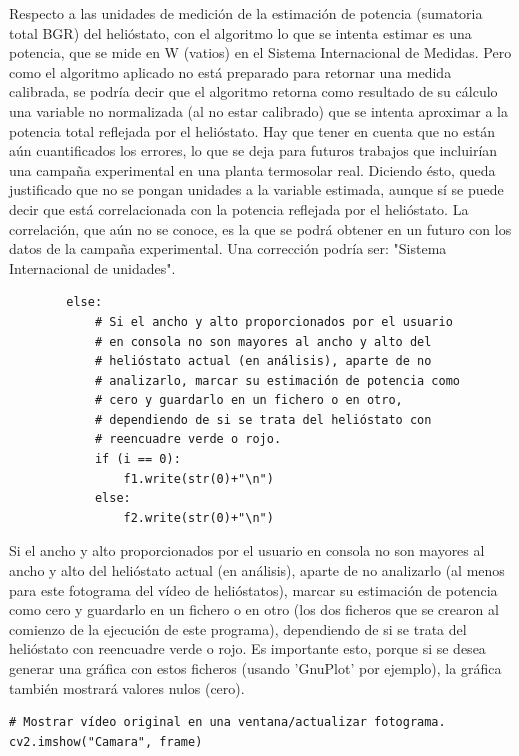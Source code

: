 Respecto a las unidades de medición de la estimación de potencia (sumatoria total BGR) del helióstato, con el algoritmo lo que se intenta estimar es una potencia, que se mide en W (vatios) en el Sistema Internacional de Medidas. Pero como el algoritmo aplicado no está preparado para retornar una medida calibrada, se podría decir que el algoritmo retorna como resultado de su cálculo una variable no normalizada (al no estar calibrado) que se intenta aproximar a la potencia total reflejada por el helióstato. Hay que tener en cuenta que no están aún cuantificados los errores, lo que se deja para futuros trabajos que incluirían una campaña experimental en una planta termosolar real. Diciendo ésto, queda justificado que no se pongan unidades a la variable estimada, aunque sí se puede decir que está correlacionada con la potencia reflejada por el helióstato. La correlación, que aún no se conoce, es la que se podrá obtener en un futuro con los datos de la campaña experimental. Una corrección podría ser: "Sistema Internacional de unidades".

\begin{lstlisting}
		else:
            # Si el ancho y alto proporcionados por el usuario
            # en consola no son mayores al ancho y alto del
            # helióstato actual (en análisis), aparte de no
            # analizarlo, marcar su estimación de potencia como
            # cero y guardarlo en un fichero o en otro,
            # dependiendo de si se trata del helióstato con
            # reencuadre verde o rojo.
            if (i == 0):
                f1.write(str(0)+"\n")
            else:
                f2.write(str(0)+"\n")
\end{lstlisting}
                
Si el ancho y alto proporcionados por el usuario en consola no son mayores al ancho y alto del helióstato actual (en análisis), aparte de no analizarlo (al menos para este fotograma del vídeo de helióstatos), marcar su estimación de potencia como cero y guardarlo en un fichero o en otro (los dos ficheros que se crearon al comienzo de la ejecución de este programa), dependiendo de si se trata del helióstato con reencuadre verde o rojo. Es importante esto, porque si se desea generar una gráfica con estos ficheros (usando 'GnuPlot' por ejemplo), la gráfica también mostrará valores nulos (cero).

\begin{lstlisting}
# Mostrar vídeo original en una ventana/actualizar fotograma.
cv2.imshow("Camara", frame)
\end{lstlisting}

